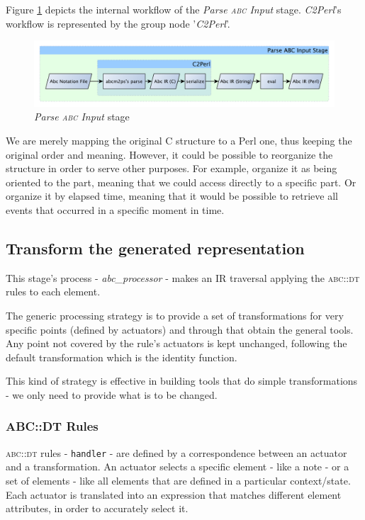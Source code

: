 \documentclass[a4paper,UKenglish]{oasics}
\newcommand{\abc}{\textsc{abc}}
\newcommand{\abcdt}{\textsc{abc::dt}}
\newcommand{\abcprocessor}{\emph{abc\_processor}}
\begin{document}
    Figure \ref{fig:parse_abc_input_stage} depicts the internal workflow of the \emph{Parse \abc{}
    Input} stage. \emph{C2Perl}'s workflow is represented by the group node '\emph{C2Perl}'.

    \begin{figure}[htb]
      \centering 
      \includegraphics[width=\textwidth]{img/parse_abc_input_stage.pdf} 
      \caption{\emph{Parse \abc{} Input} stage}
      \label{fig:parse_abc_input_stage}
    \end{figure}

    We are merely mapping the original C structure to a Perl one, thus keeping the original order
    and meaning. However, it could be possible to reorganize the structure in order to serve other
    purposes. For example, organize it as being oriented to the part, meaning that we could access
    directly to a specific part. Or organize it by elapsed time, meaning that it would be possible
    to retrieve all events that occurred in a specific moment in time.

\subsection{Transform the generated representation}

    This stage's process - \abcprocessor{} - makes an IR traversal applying the \abcdt{} rules to
    each element.

    The generic processing strategy is to provide a set of transformations for very specific points
    (defined by actuators) and through that obtain the general tools. Any point not covered by the
    rule's actuators is kept unchanged, following the default transformation which is the identity
    function.

    This kind of strategy is effective in building tools that do simple transformations - we only
    need to provide what is to be changed.

\subsubsection{ABC::DT Rules}

    \abcdt{} rules - \texttt{handler} - are defined by a correspondence between an actuator and a
    transformation. An actuator selects a specific element - like a note - or a set of elements -
    like all elements that are defined in a particular context/state. Each actuator is translated
    into an expression that matches different element attributes, in order to accurately select it.
\end{document}
